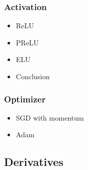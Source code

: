 			\subsubsection{Activation}
				\begin{itemize}
					\item ReLU \\
					\item PReLU \\
					\item ELU \\
					\item Conclusion
				\end{itemize}
			\subsubsection{Optimizer}
				\begin{itemize}
					\item SGD with momentum\\
					\item Adam 
				\end{itemize}
		\subsection{Derivatives}

